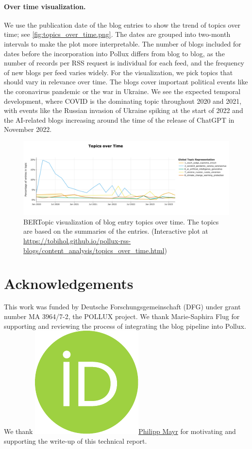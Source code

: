 \documentclass{article}
\begin{document}
\paragraph{Over time visualization.}
We use the publication date of the blog entries to show the trend of topics over time; see \autoref{fig:topics_over_time.png}. The dates are grouped into two-month intervals to make the plot more interpretable. The number of blogs included for dates before the incorporation into Pollux differs from blog to blog, as the number of records per RSS request is individual for each feed, and the frequency of new blogs per feed varies widely. For the visualization, we pick topics that should vary in relevance over time. The blogs cover important political events like the coronavirus pandemic or the war in Ukraine. We see the expected temporal development, where COVID is the dominating topic throughout 2020 and 2021, with events like the Russian invasion of Ukraine spiking at the start of 2022 and the AI-related blogs increasing around the time of the release of ChatGPT in November 2022.

\begin{figure}[!htb]
    \includegraphics[width=1.0\textwidth]{figures/topics_over_time.png}
    \caption{BERTopic visualization of blog entry topics over time. The topics are based on the summaries of the entries. (Interactive plot at \url{https://tobihol.github.io/pollux-rss-blogs/content_analysis/topics_over_time.html})}
    \label{fig:topics_over_time.png}
\end{figure}

\section*{Acknowledgements}
This work was funded by Deutsche Forschungsgemeinschaft (DFG) under grant number MA 3964/7-2, the POLLUX project.
We thank Marie-Saphira Flug for supporting and reviewing the process of integrating the blog pipeline into Pollux.
We thank \href{https://orcid.org/0000-0002-6656-1658}{\includegraphics[scale=0.06]{orcid.pdf}Philipp Mayr} for motivating and supporting the write-up of this technical report.
\printbibliography
\end{document}
